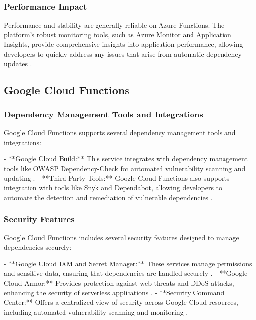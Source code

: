 \documentclass[sigconf]{acmart}
\begin{document}
\subsubsection{Performance Impact}

Performance and stability are generally reliable on Azure Functions. The platform's robust monitoring tools, such as Azure Monitor and Application Insights, provide comprehensive insights into application performance, allowing developers to quickly address any issues that arise from automatic dependency updates \cite{azurePerformance2023}.

\subsection{Google Cloud Functions}

\subsubsection{Dependency Management Tools and Integrations}

Google Cloud Functions supports several dependency management tools and integrations:

- **Google Cloud Build:** This service integrates with dependency management tools like OWASP Dependency-Check for automated vulnerability scanning and updating \cite{googleBuild2023}.
- **Third-Party Tools:** Google Cloud Functions also supports integration with tools like Snyk and Dependabot, allowing developers to automate the detection and remediation of vulnerable dependencies \cite{googlesnyk2023}.

\subsubsection{Security Features}

Google Cloud Functions includes several security features designed to manage dependencies securely:

- **Google Cloud IAM and Secret Manager:** These services manage permissions and sensitive data, ensuring that dependencies are handled securely \cite{googleSecurity2023}.
- **Google Cloud Armor:** Provides protection against web threats and DDoS attacks, enhancing the security of serverless applications \cite{googleArmor2023}.
- **Security Command Center:** Offers a centralized view of security across Google Cloud resources, including automated vulnerability scanning and monitoring \cite{googleSCC2023}.
\end{document}
